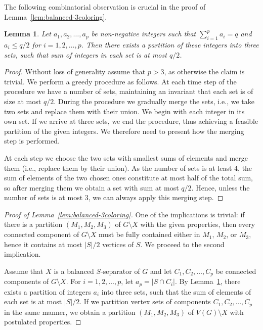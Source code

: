 \documentclass[a4paper,11pt]{article}
\newtheorem{lemma}{Lemma}[section]
\theoremstyle{definition}
\theoremstyle{remark}
\begin{document}
The following combinatorial observation is crucial in the proof of
Lemma~\ref{lem:balanced-3coloring}.

\begin{lemma}\label{lem:comb-balanced-3coloring}
  Let $a_1,a_2,\dots,a_p$ be non-negative integers such that $\sum_{i=1}^p
  a_i = q$ and $a_i \leq q/2$ for $i=1,2,\ldots,p$.  Then there exists
  a partition of these integers into three sets, such that sum of
  integers in each set is at most $q / 2$.
\end{lemma}
\begin{proof}
  Without loss of generality assume that $p>3$, as otherwise the claim
  is trivial.
  We perform a greedy procedure as follows.  At each time step of the
  procedure we have a number of sets, maintaining an invariant that each
  set is of size at most $q/2$.  During the procedure we gradually
  merge the sets, i.e., we take two sets and replace them with their
  union.  We begin with each integer in its own set.  If we arrive at
  three sets, we end the procedure, thus achieving a feasible
  partition of the given integers.  We therefore need to present how
  the merging step is performed.
  
  At each step we choose the two sets with smallest sums of elements
  and merge them (i.e., replace them by their union).  As the number
  of sets is at least $4$, the sum of elements of the two chosen ones
  constitute at most half of the total sum, so after merging them we
  obtain a set with sum at most $q/2$.  Hence, unless the number of
  sets is at most $3$, we can always apply this merging step.
\end{proof}

\begin{proof}[Proof of Lemma~\ref{lem:balanced-3coloring}]
  One of the implications is trivial: if there is a partition
  $(M_1,M_2,M_3)$ of $G\setminus X$ with the given properties, then
  every connected component of $G\setminus X$ must be fully contained
  either in $M_1$, $M_2$, or $M_3$, hence it contains at most $|S|/2$
  vertices of $S$.  We proceed to the second implication.
  
  Assume that $X$ is a balanced $S$-separator of $G$ and let
  $C_1,C_2,\ldots,C_p$ be connected components of $G\setminus X$.  For
  $i=1,2,\ldots, p$, let $a_p=|S\cap C_i|$.  By
  Lemma~\ref{lem:comb-balanced-3coloring}, there exists a partition
  of integers $a_i$ into three sets, such that the sum of elements of
  each set is at most $|S|/2$.  If we partition vertex sets of
  components $C_1,C_2,\ldots,C_p$ in the same manner, we obtain a
  partition $(M_1,M_2,M_3)$ of $V(G)\setminus X$ with postulated properties.
\end{proof}
\end{document}
